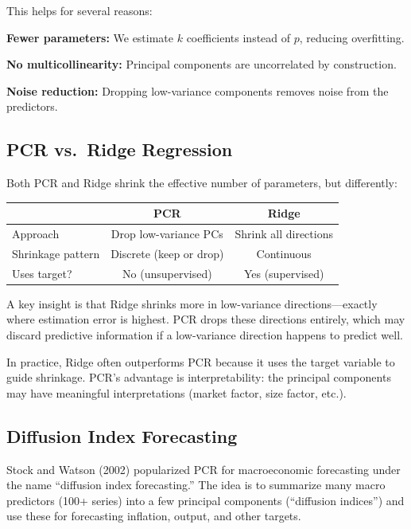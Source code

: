 \documentclass[11pt,a4paper]{article}
\begin{document}
This helps for several reasons:

\textbf{Fewer parameters:} We estimate $k$ coefficients instead of $p$, reducing overfitting.

\textbf{No multicollinearity:} Principal components are uncorrelated by construction.

\textbf{Noise reduction:} Dropping low-variance components removes noise from the predictors.

\subsection{PCR vs.\ Ridge Regression}

Both PCR and Ridge shrink the effective number of parameters, but differently:

\begin{center}
\begin{tabular}{lcc}
\toprule
& \textbf{PCR} & \textbf{Ridge} \\
\midrule
Approach & Drop low-variance PCs & Shrink all directions \\
Shrinkage pattern & Discrete (keep or drop) & Continuous \\
Uses target? & No (unsupervised) & Yes (supervised) \\
\bottomrule
\end{tabular}
\end{center}

A key insight is that Ridge shrinks more in low-variance directions---exactly where estimation error is highest. PCR drops these directions entirely, which may discard predictive information if a low-variance direction happens to predict well.

In practice, Ridge often outperforms PCR because it uses the target variable to guide shrinkage. PCR's advantage is interpretability: the principal components may have meaningful interpretations (market factor, size factor, etc.).

\subsection{Diffusion Index Forecasting}

Stock and Watson (2002) popularized PCR for macroeconomic forecasting under the name ``diffusion index forecasting.'' The idea is to summarize many macro predictors (100+ series) into a few principal components (``diffusion indices'') and use these for forecasting inflation, output, and other targets.
\end{document}
